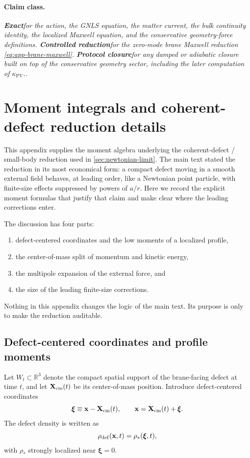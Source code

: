 \documentclass[11pt]{article}
\newcommand{\x}{\mathbf x}
\newcommand{\kPV}{\kappa_{\mathrm{PV}}}
\newcommand{\Exact}{\textbf{Exact}}
\newcommand{\Controlled}{\textbf{Controlled reduction}}
\newcommand{\Protocol}{\textbf{Protocol closure}}
\newcommand{\claimclass}[1]{\paragraph{Claim class.}\emph{#1.}}
\begin{document}
\claimclass{\Exact for the action, the GNLS equation, the matter current, the bulk
continuity identity, the localized Maxwell equation, and the conservative geometry-force
definitions. \Controlled for the zero-mode brane Maxwell reduction
\eqref{eq:app-brane-maxwell}. \Protocol for any damped or adiabatic closure built on top
of the conservative geometry sector, including the later computation of \(\kPV\).}

\section{Moment integrals and coherent-defect reduction details}
\label{app:moments}

This appendix supplies the moment algebra underlying the coherent-defect / small-body
reduction used in \cref{sec:newtonian-limit}. The main text stated the reduction in its
most economical form: a compact defect moving in a smooth external field behaves, at
leading order, like a Newtonian point particle, with finite-size effects suppressed by
powers of \(a/r\). Here we record the explicit moment formulas that justify that claim and
make clear where the leading corrections enter.

The discussion has four parts:
\begin{enumerate}[leftmargin=1.5em]
  \item defect-centered coordinates and the low moments of a localized profile,
  \item the center-of-mass split of momentum and kinetic energy,
  \item the multipole expansion of the external force, and
  \item the size of the leading finite-size corrections.
\end{enumerate}
Nothing in this appendix changes the logic of the main text. Its purpose is only to make
the reduction auditable.

\subsection{Defect-centered coordinates and profile moments}
\label{app:moments-profile}

Let \(W_t\subset \mathbb R^3\) denote the compact spatial support of the brane-facing
defect at time \(t\), and let \(\mathbf X_{\rm cm}(t)\) be its center-of-mass position.
Introduce defect-centered coordinates
\begin{equation}
\boldsymbol{\xi}\equiv \x-\mathbf X_{\rm cm}(t),
\qquad
\x=\mathbf X_{\rm cm}(t)+\boldsymbol{\xi}.
\label{eq:app-xi-def}
\end{equation}
The defect density is written as
\begin{equation}
\rho_{\rm def}(\x,t)=\rho_*(\boldsymbol{\xi},t),
\label{eq:app-rho-star}
\end{equation}
with \(\rho_*\) strongly localized near \(\boldsymbol{\xi}=0\).
\end{document}
